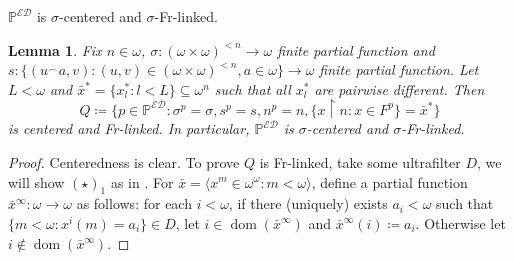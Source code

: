 \documentclass[a4paper,12pt]{amsart}
\newtheorem{lem}[thm]{Lemma}
\theoremstyle{definition}
\numberwithin{thm}{section}
\numberwithin{equation}{section}
\newcommand{\oo}{{\omega}^\omega}
\newcommand{\on}{\mathpunct{\upharpoonright}}
\DeclareMathOperator{\dom}{dom}
\newcommand{\ed}{\mathcal{ED}}
\newcommand{\posetED}{\mathbb{P}^{\ed}}
\begin{document}
    $\posetED$ is $\sigma$-centered and $\sigma$-Fr-linked.
    
    \begin{lem}\label{lem:posetED_centered_Frlinked}
    	Fix $n\in\omega$, $\sigma\colon(\omega\times\omega)^{<n}\to\omega$ finite partial function and $s\colon\{(u^\frown a,v):(u,v)\in(\omega\times\omega)^{<n},a\in\omega\}\to\omega$ finite partial function. Let $L<\omega$ and $\bar{x}^*=\{x^*_l:l<L\}\subseteq\omega^n$ such that all $x^*_l$ are pairwise different. 
    	Then
        \[
        Q\coloneqq\{p\in\posetED\colon\sigma^p=\sigma, s^p=s,n^p=n, \{x\on n\colon x\in F^p\}=\bar{x}^*\}
        \]
    	is centered and Fr-linked. In particular, $\posetED$ is $\sigma$-centered and $\sigma$-Fr-linked.
    \end{lem}
    \begin{proof}
        Centeredness is clear. To prove $Q$ is Fr-linked, take some ultrafilter $D$, we will show $(\star)_1$ as in .
    	For $\bar{x}=\langle x^m\in\oo:m<\omega\rangle$, 
    	define a partial function $\bar{x}^\infty\colon\omega\to\omega$ as follows: for each $i<\omega$, if there (uniquely) exists $a_i<\omega$ such that $\{m<\omega:x^i(m)=a_i\}\in D$,
    	let $i\in\dom(\bar{x}^\infty)$ and $\bar{x}^\infty(i)\coloneq a_i$. Otherwise let $i\notin\dom(\bar{x}^\infty)$.
    	

\end{proof}
\end{document}

